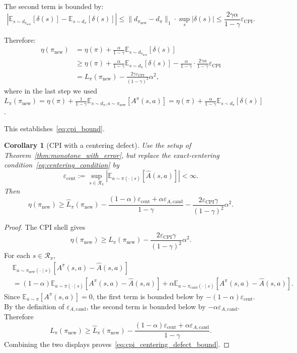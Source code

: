 \documentclass{article}
\theoremstyle{plain}
\newtheorem{corollary}[theorem]{Corollary}
\theoremstyle{definition}
\theoremstyle{remark}
\newcommand{\E}{\mathbb{E}}
\begin{document}
The second term is bounded by:
\begin{equation}
\left|\E_{s \sim d_{\pi_{\mathrm{new}}}}[\delta(s)] - \E_{s \sim d_\pi}[\delta(s)]\right| \le \|d_{\pi_{\mathrm{new}}} - d_\pi\|_1 \cdot \sup_s|\delta(s)| \le \frac{2\gamma\alpha}{1-\gamma} \varepsilon_{\mathrm{CPI}}.
\end{equation}

Therefore:
\begin{align}
\eta(\pi_{\mathrm{new}}) &= \eta(\pi) + \frac{\alpha}{1-\gamma} \E_{s \sim d_{\pi_{\mathrm{new}}}}[\delta(s)] \\
&\ge \eta(\pi) + \frac{\alpha}{1-\gamma} \E_{s \sim d_\pi}[\delta(s)] - \frac{\alpha}{1-\gamma} \cdot \frac{2\gamma\alpha}{1-\gamma} \varepsilon_{\mathrm{CPI}} \\
&= L_\pi(\pi_{\mathrm{new}}) - \frac{2\gamma\varepsilon_{\mathrm{CPI}}}{(1-\gamma)^2} \alpha^2,
\end{align}
where in the last step we used $L_\pi(\pi_{\mathrm{new}}) = \eta(\pi) + \frac{1}{1-\gamma}\E_{s \sim d_\pi, a \sim \pi_{\mathrm{new}}}[A^\pi(s,a)] = \eta(\pi) + \frac{\alpha}{1-\gamma}\E_{s \sim d_\pi}[\delta(s)]$.

This establishes~\eqref{eq:cpi_bound}.

\begin{corollary}[CPI with a centering defect]
\label{cor:cpi_centering_defect}
Use the setup of Theorem~\ref{thm:monotone_with_error}, but replace the exact-centering condition~\eqref{eq:centering_condition} by
\[
\varepsilon_{\mathrm{cent}}
:=
\sup_{s\in\mathcal R_\pi}
\left|
\E_{a\sim\pi(\cdot\mid s)}[\widehat A(s,a)]
\right|
<\infty.
\]
Then
\begin{equation}
\eta(\pi_{\mathrm{new}})
\ge
\widehat L_\pi(\pi_{\mathrm{new}})
-
\frac{(1-\alpha)\varepsilon_{\mathrm{cent}}+\alpha\varepsilon_{A,\mathrm{cand}}}{1-\gamma}
-
\frac{2\varepsilon_{\mathrm{CPI}}\gamma}{(1-\gamma)^2}\alpha^2.
\label{eq:cpi_centering_defect_bound}
\end{equation}
\end{corollary}

\begin{proof}
The CPI shell gives
\[
\eta(\pi_{\mathrm{new}})
\ge
L_\pi(\pi_{\mathrm{new}})
-
\frac{2\varepsilon_{\mathrm{CPI}}\gamma}{(1-\gamma)^2}\alpha^2.
\]
For each $s\in\mathcal R_\pi$,
\begin{align*}
&\E_{a\sim\pi_{\mathrm{new}}(\cdot\mid s)}
[A^\pi(s,a)-\widehat A(s,a)] \\
&=
(1-\alpha)
\E_{a\sim\pi(\cdot\mid s)}
[A^\pi(s,a)-\widehat A(s,a)]
+
\alpha
\E_{a\sim\pi_{\mathrm{cand}}(\cdot\mid s)}
[A^\pi(s,a)-\widehat A(s,a)].
\end{align*}
Since $\E_{a\sim\pi}[A^\pi(s,a)]=0$, the first term is bounded below by
$-(1-\alpha)\varepsilon_{\mathrm{cent}}$.
By the definition of $\varepsilon_{A,\mathrm{cand}}$, the second term is bounded below by
$-\alpha\varepsilon_{A,\mathrm{cand}}$.
Therefore
\[
L_\pi(\pi_{\mathrm{new}})
\ge
\widehat L_\pi(\pi_{\mathrm{new}})
-
\frac{(1-\alpha)\varepsilon_{\mathrm{cent}}+\alpha\varepsilon_{A,\mathrm{cand}}}{1-\gamma}.
\]
Combining the two displays proves~\eqref{eq:cpi_centering_defect_bound}.
\end{proof}
\end{document}
